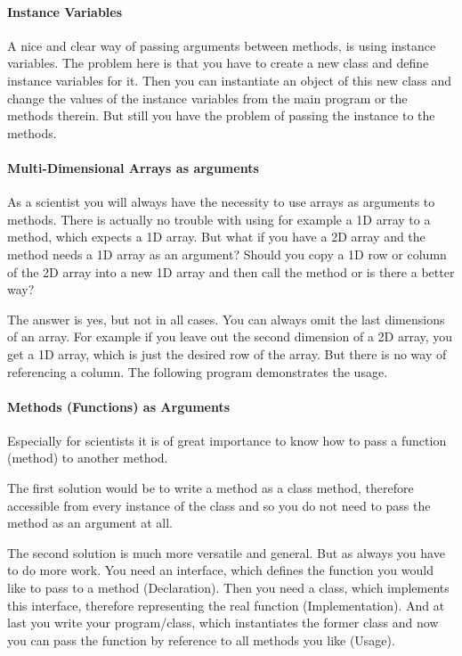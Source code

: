 \paragraph{Instance Variables}
A nice and clear way of passing arguments between methods, is
using instance variables. The problem here is that you have
to create a new class and define instance variables for it.
Then you can instantiate an object of this new class and
change the values of the instance variables from the main
program or the methods therein. But still you have the problem
of passing the instance to the methods.

\paragraph{Multi-Dimensional Arrays as arguments}
As a scientist you will always have the necessity to use arrays
as arguments to methods. There is actually no trouble with using
for example a 1D array to a method, which expects a 1D array. But 
what if you have a 2D array and the method needs a 1D array as
an argument? Should you copy a 1D row or column of the 2D array
into a new 1D array and then call the method or is there a better
way? 

The answer is yes, but not in all cases. You can always omit 
the last dimensions of an array. For example if you leave out
the second dimension of a 2D array, you get a 1D array, which is 
just the desired row of the array. But there is no way of referencing a
column. The following program demonstrates the usage.
 

\paragraph{Methods (Functions) as Arguments} 
Especially for scientists it is of great importance to know how
to pass a function (method) to another method.

The first solution would be to write a method as a class method,
therefore accessible from every instance of the class and
so you do not need to pass the method as an argument at all.

The second solution is much more versatile and general.
But as always you have to do more work. You need an interface,
which defines the function you would like to pass to a method
(Declaration). Then you need a class, which implements this
interface, therefore representing the real function (Implementation).
And at last you write your program/class, which instantiates
the former class and now you can pass the function by reference
to all methods you like (Usage).  

